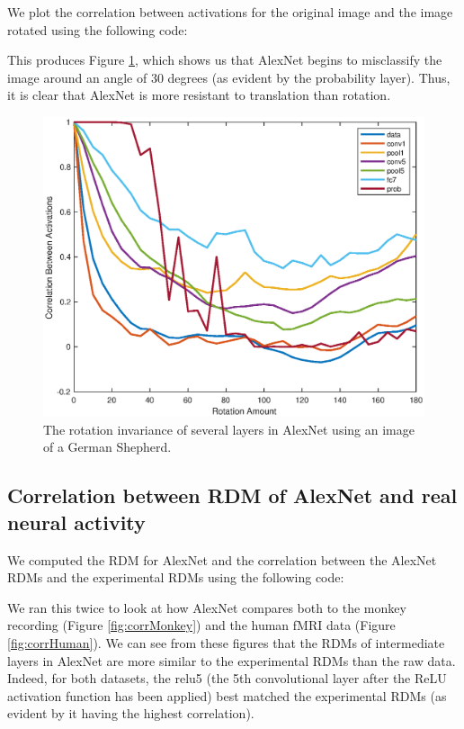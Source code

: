 \documentclass[11pt, oneside]{article}
\begin{document}
We plot the correlation between activations for the original image and the image rotated using the following code:

This produces Figure \ref{fig:netRot}, which shows us that AlexNet begins to misclassify the image around an angle of 30 degrees (as evident by the probability layer). Thus, it is clear that AlexNet is more resistant to translation than rotation.

\begin{figure}[ht!]
\includegraphics[width=1\textwidth]{rot_invar.eps}
\caption{The rotation invariance of several layers in AlexNet using an image of a German Shepherd.}
\label{fig:netRot}
\end{figure}

\subsection{Correlation between RDM of AlexNet and real neural activity}

We computed the RDM for AlexNet and the correlation between the AlexNet RDMs and the experimental RDMs using the following code:

We ran this twice to look at how AlexNet compares both to the monkey recording (Figure \ref{fig:corrMonkey}) and the human fMRI data (Figure \ref{fig:corrHuman}). We can see from these figures that the RDMs of intermediate layers in AlexNet are more similar to the experimental RDMs than the raw data. Indeed, for both datasets, the relu5 (the 5th convolutional layer after the ReLU activation function has been applied) best matched the experimental RDMs (as evident by it having the highest correlation).
\end{document}
